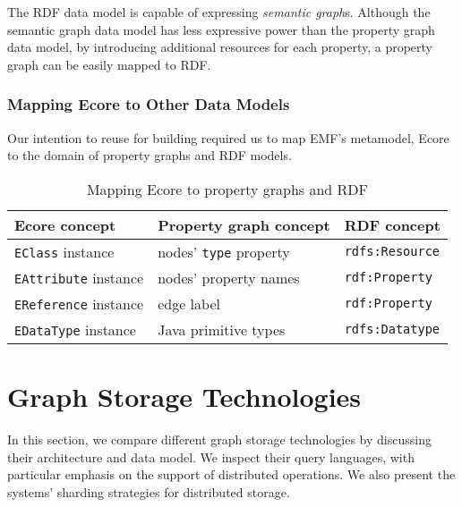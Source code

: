 The RDF data model is capable of expressing \emph{semantic graph}s. Although the semantic graph data model has less expressive power than the property graph data model, by introducing additional resources for each property, a property graph can be easily mapped to RDF.

\subsubsection{Mapping Ecore to Other Data Models}
\label{ecore-mapping}

Our intention to reuse \eiq{} for building \iqd{} required us to map EMF's metamodel, Ecore to the domain of property graphs and RDF models.

\begin{table}[htb]

\centering
\begin{tabular}{ | l | l | l | }

\hline
\bf Ecore concept          & \bf Property graph concept  & \bf RDF concept \tabularnewline \hline\hline
\verb+EClass+ instance     & nodes' \verb+type+ property & \verb+rdfs:Resource+ \\ \hline
\verb+EAttribute+ instance & nodes' property names       & \verb+rdf:Property+  \\ \hline
\verb+EReference+ instance & edge label                  & \verb+rdf:Property+  \\ \hline
\verb+EDataType+ instance  & Java primitive types        & \verb+rdfs:Datatype+ \\ \hline
 
\end{tabular}
\caption{Mapping Ecore to property graphs and RDF}
\label{tab:ecore-mapping}

\end{table}





\section{Graph Storage Technologies}
\label{graph-storage-technologies}

In this section, we compare different graph storage technologies by discussing their architecture and data model. We inspect their query languages, with particular emphasis on the support of distributed operations. We also present the systems' sharding strategies for distributed storage.

